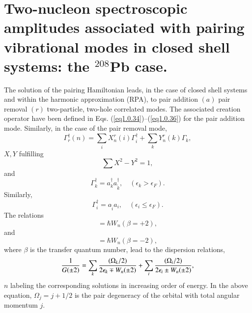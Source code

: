 \section[Pair vibration spectroscopic amplitudes]{Two-nucleon spectroscopic amplitudes associated with pairing vibrational modes in closed shell systems: the $^{208}$Pb case.}\label{App1E}
The solution of the pairing Hamiltonian
leads, in the case of closed shell systems and within the harmonic approximation (RPA), to pair addition $(a)$ pair removal $(r)$ two-particle, two-hole correlated modes. The associated creation  operator have been defined in Eqs. (\ref{eq1.0.34})--(\ref{eq1.0.36})
for the pair addition mode. Similarly, in the case of the pair removal mode, 
\begin{equation*}
\Gamma_r^\dagger(n)=\sum_i X_n^r(i)\Gamma_i^\dagger+\sum_kY^r_n(k)\Gamma_k,
\end{equation*}
$X,Y$ fulfilling
\begin{equation*}
\sum X^2-Y^2=1,
\end{equation*}
and
\begin{equation*}
\Gamma_k^\dagger=a_k^\dagger a_{\tilde k}^\dagger,\quad (\epsilon_k>\epsilon_F).
\end{equation*}
Similarly,
\begin{equation*}
\Gamma_i^\dagger=a_{\tilde i} a_i ,\quad (\epsilon_i\leq\epsilon_F).
\end{equation*}
The relations
\begin{equation*}
[H,\Gamma_a^\dagger(n)]=\hbar W_n (\beta=+2),
\end{equation*}
and
\begin{equation*}
[H,\Gamma_r^\dagger(n)]=\hbar W_n (\beta=-2),
\end{equation*}
where $\beta$ is the transfer quantum number, lead to the dispersion relations, 
\begin{equation}\label{eq3.5.1}
\frac{1}{G(\pm2)}=\sum_k \frac{(\Omega_k/2)}{2\epsilon_k\mp W_n(\pm2)}+\sum_i \frac{(\Omega_i/2)}{2\epsilon_i\pm W_n(\pm2)}, \idx{Pairing vibrations!RPA relations}
\end{equation}
$n$ labeling the corresponding solutions in increasing order of energy. In the above equation, $\Omega_j=j+1/2$ is the pair degeneracy of the orbital with total angular momentum $j$.





